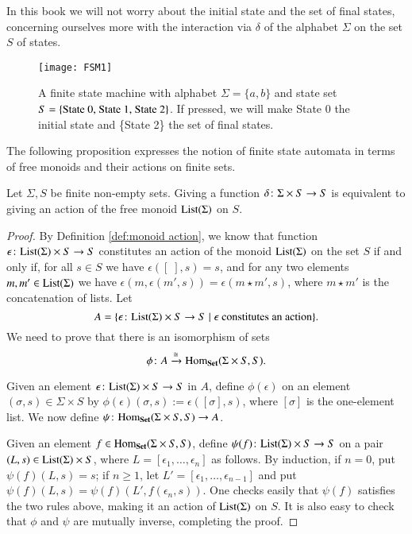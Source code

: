 In this book we will not worry about the initial state and the set of final states, concerning ourselves more with the interaction via $\delta$ of the alphabet $\Sigma$ on the set $S$ of states.

\begin{figure}[h]
\begin{center}
\texttt{[image: FSM1]}
\end{center}
\caption{A finite state machine with alphabet $\Sigma=\{a,b\}$ and state set $S=\{\tn{State 0, State 1, State 2}\}$. If pressed, we will make State 0 the initial state and \{State 2\} the set of final states.}\label{fig:fsa}
\end{figure}
The following proposition expresses the notion of finite state automata in terms of free monoids and their actions on finite sets.

\begin{proposition}

Let $\Sigma, S$ be finite non-empty sets. Giving a function $\delta\colon\Sigma\times S\rightarrow S$ is equivalent to giving an action of the free monoid $\List(\Sigma)$ on $S$. 

\end{proposition}

\begin{proof}

By Definition \ref{def:monoid action}, we know that function $\epsilon\taking\List(\Sigma)\times S\to S$ constitutes an action of the monoid $\List(\Sigma)$ on the set $S$ if and only if, for all $s\in S$ we have $\epsilon([\;],s)=s$, and for any two elements $m,m'\in\List(\Sigma)$ we have $\epsilon(m,\epsilon(m',s))=\epsilon(m\star m',s)$, where $m\star m'$ is the concatenation of lists. Let $$A=\{\epsilon\taking \List(\Sigma)\times S\to S\|\epsilon\tn{ constitutes an action}\}.$$ We need to prove that there is an isomorphism of sets $$\phi\taking A\To{\iso}\Hom_\Set(\Sigma\times S,S).$$

Given an element $\epsilon\taking\List(\Sigma)\times S\to S$ in $A$, define $\phi(\epsilon)$ on an element $(\sigma,s)\in\Sigma\times S$ by $\phi(\epsilon)(\sigma,s):=\epsilon([\sigma],s)$, where $[\sigma]$ is the one-element list. We now define $\psi\taking\Hom_\Set(\Sigma\times S,S)\to A$.

Given an element $f\in\Hom_\Set(\Sigma\times S,S)$, define $\psi(f)\taking\List(\Sigma)\times S\to S$ on a pair $(L,s)\in\List(\Sigma)\times S$, where $L=[\epsilon_1,\ldots,\epsilon_n]$ as follows. By induction, if $n=0$, put $\psi(f)(L,s)=s$; if $n\geq 1$, let $L'=[\epsilon_1,\ldots,\epsilon_{n-1}]$ and put $\psi(f)(L,s)=\psi(f)(L',f(\epsilon_n,s))$. One checks easily that $\psi(f)$ satisfies the two rules above, making it an action of $\List(\Sigma)$ on $S$. It is also easy to check that $\phi$ and $\psi$ are mutually inverse, completing the proof.

\end{proof}

